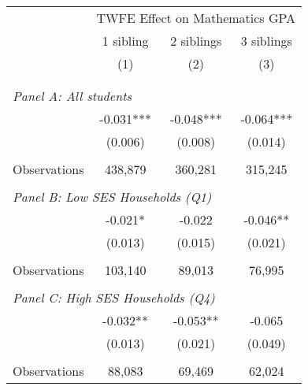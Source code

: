 \makeatletter
{}
{
\makeatother
\begin{tabular}{lccc}
\toprule
\cmidrule(lr){2-4}
& \multicolumn{3}{c}{TWFE Effect on Mathematics GPA} \\
\cmidrule(lr){2-4}
& 1 sibling & 2 siblings & 3 siblings  \\
\cmidrule(lr){2-2} \cmidrule(lr){3-3} \cmidrule(lr){4-4}
& (1) & (2) & (3)\\
\bottomrule
&  &  &  \\
&  &  &   \\
\multicolumn{4}{l}{\textit{Panel A: All students}} \\
\hspace{3mm}        &      -0.031***&      -0.048***&      -0.064***\\
                    &     (0.006)   &     (0.008)   &     (0.014)   \\
                    &               &               &               \\
\hspace{3mm}Observations&     438,879   &     360,281   &     315,245   \\
 
&  &  &   \\
\multicolumn{4}{l}{\textit{Panel B: Low SES Households (Q1)}} \\
\hspace{3mm}        &      -0.021*  &      -0.022   &      -0.046** \\
                    &     (0.013)   &     (0.015)   &     (0.021)   \\
                    &               &               &               \\
\hspace{3mm}Observations&     103,140   &      89,013   &      76,995   \\
 
&  &  &   \\
\multicolumn{4}{l}{\textit{Panel C: High SES Households (Q4)}} \\
\hspace{3mm}        &      -0.032** &      -0.053** &      -0.065   \\
                    &     (0.013)   &     (0.021)   &     (0.049)   \\
                    &               &               &               \\
\hspace{3mm}Observations&      88,083   &      69,469   &      62,024   \\
 

\end{tabular}}
